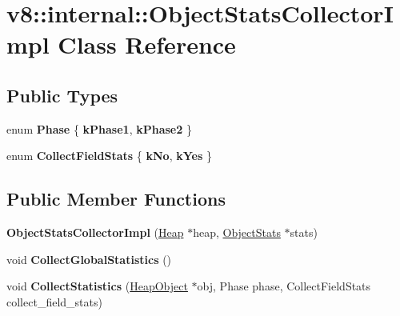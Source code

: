 \hypertarget{classv8_1_1internal_1_1ObjectStatsCollectorImpl}{}\section{v8\+:\+:internal\+:\+:Object\+Stats\+Collector\+Impl Class Reference}
\label{classv8_1_1internal_1_1ObjectStatsCollectorImpl}
\subsection*{Public Types}
\begin{DoxyCompactItemize}
\item 
\mbox{\label{classv8_1_1internal_1_1ObjectStatsCollectorImpl_acfa7d5c7ab3ac4dbd027c986730a85cf}} 
enum {\bfseries Phase} \{ {\bfseries k\+Phase1}, 
{\bfseries k\+Phase2}
 \}
\item 
\mbox{\label{classv8_1_1internal_1_1ObjectStatsCollectorImpl_a4ca8b75bfc0a8803354f7419ac605c91}} 
enum {\bfseries Collect\+Field\+Stats} \{ {\bfseries k\+No}, 
{\bfseries k\+Yes}
 \}
\end{DoxyCompactItemize}
\subsection*{Public Member Functions}
\begin{DoxyCompactItemize}
\item 
\mbox{\label{classv8_1_1internal_1_1ObjectStatsCollectorImpl_a5400ffa3965ec12e451443e9ddb1529d}} 
{\bfseries Object\+Stats\+Collector\+Impl} (\mbox{\hyperlink{classv8_1_1internal_1_1Heap}{Heap}} $\ast$heap, \mbox{\hyperlink{classv8_1_1internal_1_1ObjectStats}{Object\+Stats}} $\ast$stats)
\item 
\mbox{\label{classv8_1_1internal_1_1ObjectStatsCollectorImpl_a54e924df78e66dc193a8bbf2cab34371}} 
void {\bfseries Collect\+Global\+Statistics} ()
\item 
\mbox{\label{classv8_1_1internal_1_1ObjectStatsCollectorImpl_ac7444d6ec430bb18dc09a2153ce73ee4}} 
void {\bfseries Collect\+Statistics} (\mbox{\hyperlink{classv8_1_1internal_1_1HeapObject}{Heap\+Object}} $\ast$obj, Phase phase, Collect\+Field\+Stats collect\+\_\+field\+\_\+stats)
\end{DoxyCompactItemize}
